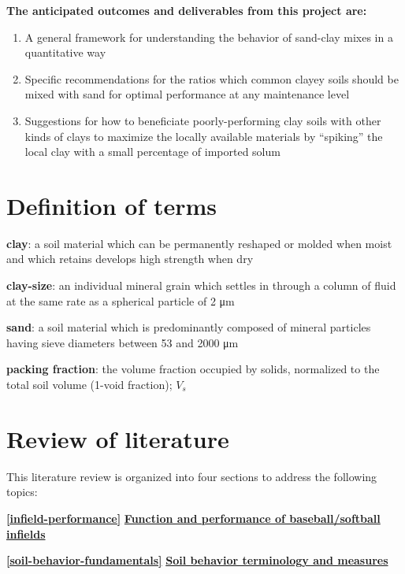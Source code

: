 \documentclass[
]{book}
\providecommand{\tightlist}{%
  \setlength{\itemsep}{0pt}\setlength{\parskip}{0pt}}
\begin{document}
\textbf{The anticipated outcomes and deliverables from this project are:}

\begin{enumerate}
\def\labelenumi{\arabic{enumi}.}
\tightlist
\item
  A general framework for understanding the behavior of sand-clay mixes in a quantitative way
\item
  Specific recommendations for the ratios which common clayey soils should be mixed with sand for optimal performance at any maintenance level
\item
  Suggestions for how to beneficiate poorly-performing clay soils with other kinds of clays to maximize the locally available materials by ``spiking'' the local clay with a small percentage of imported solum
\end{enumerate}

\hypertarget{definition-of-terms}{%
\chapter{Definition of terms}\label{definition-of-terms}}

\textbf{clay}: a soil material which can be permanently reshaped or molded when moist and which retains develops high strength when dry

\textbf{clay-size}: an individual mineral grain which settles in through a column of fluid at the same rate as a spherical particle of 2 μm

\textbf{sand}: a soil material which is predominantly composed of mineral particles having sieve diameters between 53 and 2000 μm

\textbf{packing fraction}: the volume fraction occupied by solids, normalized to the total soil volume (1-void fraction); \(V_{s}\)

\hypertarget{lit-review}{%
\chapter{Review of literature}\label{lit-review}}

This literature review is organized into four sections to address the following topics:

\textbf{\ref{infield-performance}} \protect\hyperlink{infield-performance}{\textbf{Function and performance of baseball/softball infields}}

\textbf{\ref{soil-behavior-fundamentals}} \protect\hyperlink{soil-behavior-fundamentals}{\textbf{Soil behavior terminology and measures}}
\end{document}
